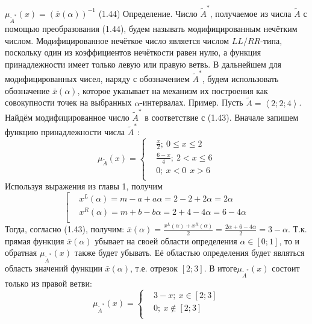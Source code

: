 	${{\mu }_{{{{\tilde{A}}}^{*}}}}\left( x \right)={{\left( \bar{x}\left( \alpha  \right) \right)}^{-1}}$ 	(1.44)
Определение. Число ${{\tilde{A}}^{*}}$, получаемое из числа $\tilde{A}$ с помощью преобразования (1.44), будем называть модифицированным нечётким числом. Модифицированное нечёткое число является числом $LL/RR$-типа, поскольку один из коэффициентов нечёткости равен нулю, а функция принадлежности имеет только левую или правую ветвь. В дальнейшем для модифицированных чисел, наряду с обозначением ${{\tilde{A}}^{*}}$, будем использовать обозначение $\bar{x}\left( \alpha  \right)$, которое указывает на механизм их построения как совокупности точек на выбранных $\alpha $-интервалах.
Пример. Пусть $\tilde{A}=\left\langle 2;2;4 \right\rangle $. Найдём модифицированное число ${{\tilde{A}}^{*}}$ в соответствие с (1.43).
Вначале запишем функцию принадлежности числа ${{\tilde{A}}^{*}}$:
	\[{{\mu }_{{\tilde{A}}}}\left( x \right)=\left\{ \begin{aligned}
  & \frac{x}{2};\ 0\le x\le 2 \\ 
 & \frac{6-x}{4};\ 2<x\le 6 \\ 
 & 0;\ x<0\ \ x>6 \\ 
\end{aligned} \right.\] 
Используя выражения из главы 1, получим
	\[\left[ \begin{aligned}
  & {{x}^{L}}\left( \alpha  \right)=m-a+a\alpha =2-2+2\alpha =2\alpha  \\ 
 & {{x}^{R}}\left( \alpha  \right)=m+b-b\alpha =2+4-4\alpha =6-4\alpha  \\ 
\end{aligned} \right.\] 
Тогда, согласно (1.43), получим:
	$\bar{x}\left( \alpha  \right)=\frac{{{x}^{L}}\left( \alpha  \right)+{{x}^{R}}\left( \alpha  \right)}{2}=\frac{2\alpha +6-4\alpha }{2}=3-\alpha $.
Т.к. прямая функция $\bar{x}\left( \alpha  \right)$ убывает на своей области определения $\alpha \in \left[ 0;1 \right]$, то и обратная ${{\mu }_{{{{\tilde{A}}}^{*}}}}\left( x \right)$ также будет убывать. Её областью определения будет являться область значений функции $\bar{x}\left( \alpha  \right)$, т.е. отрезок $\left[ 2;3 \right]$. В итоге${{\mu }_{{{{\tilde{A}}}^{*}}}}\left( x \right)$ состоит только из правой ветви:
	\[{{\mu }_{{{{\tilde{A}}}^{*}}}}\left( x \right)=\left\{ \begin{aligned}
  & 3-x;\ x\in \left[ 2;3 \right] \\ 
 & 0;\ x\notin \left[ 2;3 \right] \\ 
\end{aligned} \right.\] 
